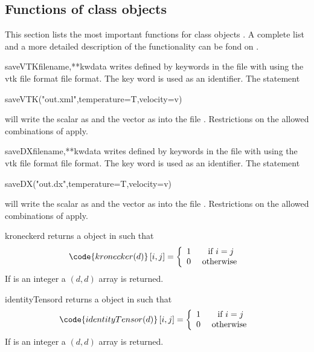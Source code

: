 \subsection{Functions of \Data class objects}
This section lists the most important functions for \Data class objects .
A complete list and a more detailed description of the functionality can be fond on \ReferenceGuide.
\begin{funcdesc}{saveVTK}{filename,**kwdata}
writes \Data defined by keywords in the file with  using the 
vtk file format \VTK file format. The key word is used as an identifier. The statement
\begin{python}
saveVTK("out.xml",temperature=T,velocity=v)
\end{python} 
will write the scalar  as  and the vector  as   into the 
file . Restrictions on the allowed combinations of \FunctionSpace apply.
\end{funcdesc}
\begin{funcdesc}{saveDX}{filename,**kwdata}
writes \Data defined by keywords in the file with  using the 
vtk file format \OpenDX file format. The key word is used as an identifier. The statement
\begin{python}
saveDX("out.dx",temperature=T,velocity=v)
\end{python} 
will write the scalar  as  and the vector  as   into the 
file . Restrictions on the allowed combinations of \FunctionSpace apply.
\end{funcdesc}
\begin{funcdesc}{kronecker}{d}
returns a \RankTwo \Data object in \FunctionSpace {} such that
\begin{equation}
\code{kronecker(d)}\left[ i,j\right] = \left\{ 
\begin{array}{cc}
1 & \mbox{ if } i=j \\
0 & \mbox{ otherwise }
\end{array}
\right.
\end{equation}
If  is an integer a $(d,d)$ \numarray array is returned.
\end{funcdesc}
\begin{funcdesc}{identityTensor}{d}
returns a \RankTwo \Data object in \FunctionSpace {} such that
\begin{equation}
\code{identityTensor(d)}\left[ i,j\right] = \left\{ 
\begin{array}{cc}
1 & \mbox{ if } i=j \\
0 & \mbox{ otherwise }
\end{array}
\right.
\end{equation}
If  is an integer a $(d,d)$ \numarray array is returned.
\end{funcdesc}
